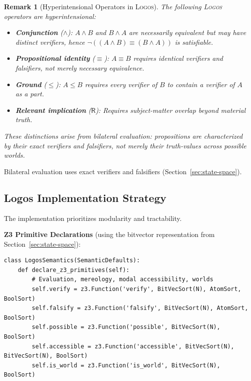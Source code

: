 \documentclass[pdflatex,sn-mathphys-num]{sn-jnl}
\newcommand{\lneg}{\neg}                    %
\newcommand{\ground}{\leq}                  %
\newcommand{\propident}{\equiv}             %
\newcommand{\relimpl}{\mathsf{R}}           %
\newcommand{\theorylogos}{\textsc{Logos}}
\theoremstyle{thmstyleone}
\theoremstyle{thmstyletwo}
\newtheorem{remark}{Remark}
\theoremstyle{thmstylethree}
\begin{document}
\begin{remark}[Hyperintensional Operators in \theorylogos{}]\label{rem:hyperintensional-operators}
The following \theorylogos{} operators are hyperintensional:
\begin{itemize}
    \item \textbf{Conjunction} ($\land$): $A \land B$ and $B \land A$ are necessarily equivalent but may have distinct verifiers, hence $\lneg((A \land B) \propident (B \land A))$ is satisfiable.
    \item \textbf{Propositional identity} ($\propident$): $A \propident B$ requires identical verifiers \emph{and} falsifiers, not merely necessary equivalence.
    \item \textbf{Ground} ($\ground$): $A \ground B$ requires every verifier of $B$ to contain a verifier of $A$ as a part.
    \item \textbf{Relevant implication} ($\relimpl$): Requires subject-matter overlap beyond material truth.
\end{itemize}
These distinctions arise from bilateral evaluation: propositions are characterized by their exact verifiers and falsifiers, not merely their truth-values across possible worlds.
\end{remark}

Bilateral evaluation uses exact verifiers and falsifiers (Section~\ref{sec:state-space}).

\subsection{Logos Implementation Strategy}\label{sec:logos-implementation}

The implementation prioritizes modularity and tractability.

\textbf{Z3 Primitive Declarations} (using the bitvector representation from Section~\ref{sec:state-space}):
\begin{lstlisting}[caption={\theorylogos{} Z3 primitives}]
class LogosSemantics(SemanticDefaults):
    def declare_z3_primitives(self):
        # Evaluation, mereology, modal accessibility, worlds
        self.verify = z3.Function('verify', BitVecSort(N), AtomSort, BoolSort)
        self.falsify = z3.Function('falsify', BitVecSort(N), AtomSort, BoolSort)
        self.possible = z3.Function('possible', BitVecSort(N), BoolSort)
        self.accessible = z3.Function('accessible', BitVecSort(N), BitVecSort(N), BoolSort)
        self.is_world = z3.Function('is_world', BitVecSort(N), BoolSort)
\end{lstlisting}
\end{document}
